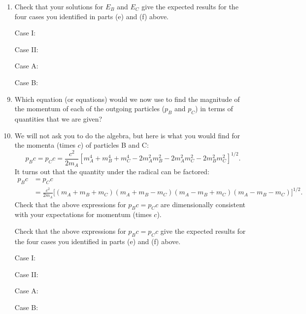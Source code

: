 \documentclass[11pt, letterpaper, openany]{book}
\begin{document}
\begin{enumerate}[label=(\alph*)]
    \item Check that your solutions for $E_B$ and $E_C$ give the expected results for the four cases you identified in parts (e) and (f) above.
    
    Case I: \vspace{1cm}
    
    Case II: \vspace{1cm}
    
    Case A: \vspace{1cm}
    
    Case B: \vspace{1cm}
\end{enumerate}

\begin{enumerate}[label=(\alph*)]
\setcounter{enumi}{8}
    \item Which equation (or equations) would we now use to find the magnitude of the momentum of each of the outgoing particles ($p_B$ and $p_C$) in terms of quantities that we are given?
    \vspace{2cm}
    \item We will not ask you to do the algebra, but here is what you would find for the momenta (times $c$) of particles B and C:
    \[ p_Bc = p_Cc = \frac{c^2}{2m_A} \left[ m_A^4 + m_B^4 + m_C^4 - 2m_A^2m_B^2 - 2m_A^2m_C^2 - 2m_B^2m_C^2 \right]^{1/2}. \]
    It turns out that the quantity under the radical can be factored:
    \begin{align*}
        p_Bc &= p_Cc \\
             &= \frac{c^2}{2m_A} \Big[ (m_A + m_B + m_C)(m_A + m_B - m_C)(m_A - m_B + m_C)(m_A - m_B - m_C) \Big]^{1/2}.
    \end{align*}
    Check that the above expressions for $p_Bc = p_Cc$ are dimensionally consistent with your expectations for momentum (times $c$).
    \vspace{2cm}
    
    Check that the above expressions for $p_Bc = p_Cc$ give the expected results for the four cases you identified in parts (e) and (f) above.
    
    Case I: \vspace{1cm}
    
    Case II: \vspace{1cm}
    
    Case A: \vspace{1cm}
    
    Case B: \vspace{1cm}
\end{enumerate}
\end{document}
